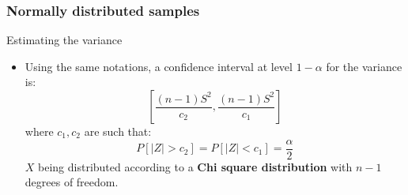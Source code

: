 \documentclass[main.tex]{subfiles}
\begin{document}
\begin{frame}
    \frametitle{Normally distributed samples}
    \begin{block}{Estimating the variance}
\begin{itemize}
    \item<+-> Using the same notations, a confidence interval at level $1-\alpha$ for the variance is:
    \begin{equation}
        \left[ \frac{(n-1)S^2}{c_2}, \frac{(n-1)S^2}{c_1} \right]
    \end{equation}
    where $c_1,c_2$ are such that:
    \begin{equation}
        P\left[ \lvert Z \rvert > c_2 \right] = P\left[ \lvert Z \rvert < c_1 \right] = \frac{\alpha}{2}
    \end{equation}
    $X$ being distributed according to a \textbf{Chi square distribution} with $n-1$ degrees of freedom.
\end{itemize}
    \end{block}
\end{frame}
\end{document}
